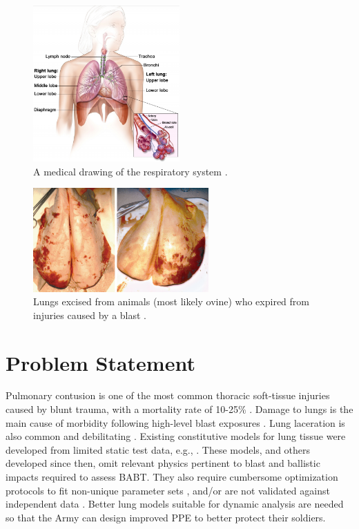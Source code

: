 \begin{figure}
    \centering\includegraphics[width=0.5\textwidth]{figures/theRespiratorySystem.png}
    \caption{A medical drawing of the respiratory system \cite{Josey10}.}
    \label{figLungDrawing}
\end{figure}

\begin{figure}
    \centering\includegraphics[width=0.6\textwidth]{figures/lungInjuryResultingFromBlast.png}
    \caption{Lungs excised from animals (most likely ovine) who expired from injuries caused by a blast \cite{Stuhmiller08}.}
    \label{figDamagedLung}
\end{figure}

\section{Problem Statement}

Pulmonary contusion is one of the most common thoracic soft-tissue injuries caused by blunt trauma, with a mortality rate of 10-25\% \citep{Stitzeletal05}.  Damage to lungs is the main cause of morbidity following high-level blast exposures \citep{Stuhmilleretal88}.  Lung laceration is also common and debilitating \citep{VlessisTrunkey97}.  Existing constitutive models for lung tissue were developed from limited static test data, e.g., \cite{Fungetal78,Vawteretal79,Vawter80}.  These models, and others developed since then, omit relevant physics pertinent to blast and ballistic impacts required to assess BABT.  They also require cumbersome optimization protocols to fit non-unique parameter sets \citep{Gayziketal07,Gayziketal11}, and\slash or are not validated against independent data \citep{Yuenetal08}.  Better lung models suitable for dynamic analysis are needed so that the Army can design improved PPE to better protect their soldiers.

